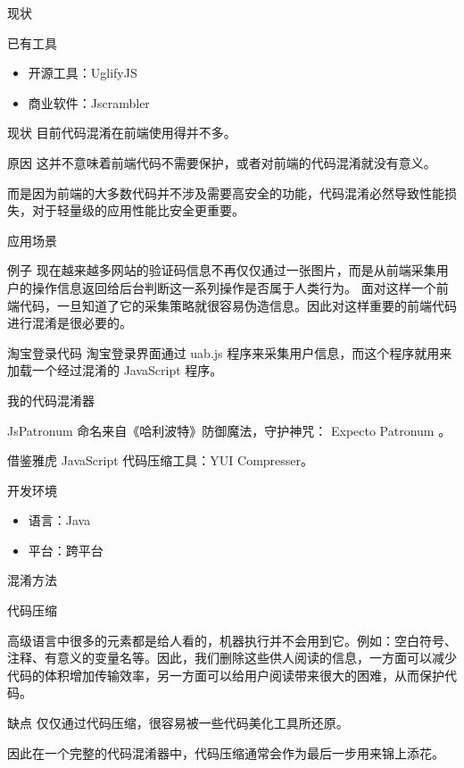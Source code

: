 \documentclass[presentation]{beamer}
\begin{document}
\begin{frame}[label=sec-4]{现状}
\begin{block}{已有工具}
\begin{itemize}
\item 开源工具：UglifyJS
\item 商业软件：Jscrambler
\end{itemize}
\end{block}
\begin{block}{现状}
目前代码混淆在前端使用得并不多。
\begin{block}{原因}
这并不意味着前端代码不需要保护，或者对前端的代码混淆就没有意义。

而是因为前端的大多数代码并不涉及需要高安全的功能，代码混淆必然导致性能损失，对于轻量级的应用性能比安全更重要。
\end{block}
\end{block}
\end{frame}
\begin{frame}[label=sec-5]{应用场景}
\begin{block}{例子}
现在越来越多网站的验证码信息不再仅仅通过一张图片，而是从前端采集用户的操作信息返回给后台判断这一系列操作是否属于人类行为。
面对这样一个前端代码，一旦知道了它的采集策略就很容易伪造信息。因此对这样重要的前端代码进行混淆是很必要的。
\end{block}
\begin{block}{淘宝登录代码}
淘宝登录界面通过 uab.js 程序来采集用户信息，而这个程序就用来加载一个经过混淆的 JavaScript 程序。
\end{block}
\end{frame}
\begin{frame}[label=sec-6]{我的代码混淆器}
\begin{block}{JsPatronum}
命名来自《哈利波特》防御魔法，守护神咒： Expecto Patronum 。

借鉴雅虎 JavaScript 代码压缩工具：YUI Compresser。
\end{block}
\begin{block}{开发环境}
\begin{itemize}
\item 语言：Java
\item 平台：跨平台
\end{itemize}
\end{block}
\end{frame}
\begin{frame}[label=sec-7]{混淆方法}
\begin{block}{代码压缩}

高级语言中很多的元素都是给人看的，机器执行并不会用到它。例如：空白符号、注释、有意义的变量名等。因此，我们删除这些供人阅读的信息，一方面可以减少代码的体积增加传输效率，另一方面可以给用户阅读带来很大的困难，从而保护代码。
\end{block}
\begin{block}{缺点}
仅仅通过代码压缩，很容易被一些代码美化工具所还原。

因此在一个完整的代码混淆器中，代码压缩通常会作为最后一步用来锦上添花。
\end{block}
\end{frame}
\end{document}
